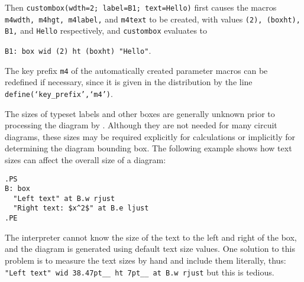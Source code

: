 Then {\tt custombox(wdth=2; label=B1; text=Hello)}
first causes the macros {\tt m4wdth, m4hgt, m4label,} and {\tt m4text}
to be created, with values {\tt (2), (boxht), B1,} and {\tt Hello}
respectively, and {\tt custombox} evaluates to

{\tt B1:\ box wid (2) ht (boxht) "Hello"}.

The key prefix {\tt m4} of the automatically created parameter macros can be
redefined if necessary, since it is given in the distribution by the line
{\tt define(`key\_prefix',`m4')}.


The sizes of typeset labels and other \tex boxes are generally unknown
prior to processing the diagram by \latex.
Although they are not needed for many circuit diagrams,
these sizes may be required explicitly for calculations or implicitly
for determining the diagram bounding box.  
The following example shows how text sizes can affect the overall size of
a diagram:

\begin{verbatim}
.PS
B: box
  "Left text" at B.w rjust
  "Right text: $x^2$" at B.e ljust
.PE
\end{verbatim}

The \pic interpreter cannot know the size of the text to the left
and right of the box, and the diagram is generated using
default text size values.  One solution to this problem is to measure the
text sizes by hand and include them literally, thus:\hfill\break
\hbox{}\quad%
\verb|"Left text" wid 38.47pt__ ht 7pt__ at B.w rjust|\hfill\break
but this is tedious.

